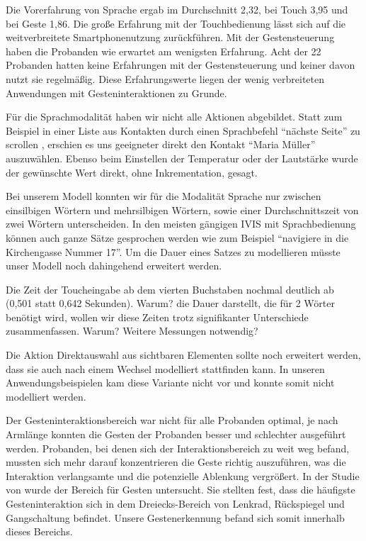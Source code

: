 Die Vorerfahrung von Sprache ergab im Durchschnitt 2,32, bei Touch 3,95 und bei Geste 1,86. Die große Erfahrung mit der Touchbedienung lässt sich auf die weitverbreitete Smartphonenutzung zurückführen. Mit der Gestensteuerung haben die Probanden wie erwartet am wenigsten Erfahrung. Acht der 22 Probanden hatten keine Erfahrungen mit der Gestensteuerung und keiner davon nutzt sie regelmäßig. Diese Erfahrungswerte liegen der wenig verbreiteten Anwendungen mit Gesteninteraktionen zu Grunde.

Für die Sprachmodalität haben wir nicht alle Aktionen abgebildet. 
Statt zum Beispiel in einer Liste aus Kontakten durch einen Sprachbefehl "`nächste Seite"' zu scrollen , erschien es uns geeigneter direkt den Kontakt "`Maria Müller"' auszuwählen. Ebenso beim Einstellen der Temperatur oder der Lautstärke wurde der gewünschte Wert direkt, ohne Inkrementation, gesagt.

Bei unserem Modell konnten wir für die Modalität Sprache nur zwischen einsilbigen Wörtern und mehrsilbigen Wörtern, sowie einer Durchschnittszeit von zwei Wörtern unterscheiden. In den meisten gängigen IVIS mit Sprachbedienung können auch ganze Sätze gesprochen werden wie zum Beispiel "`navigiere in die Kirchengasse Nummer 17"'. Um die Dauer eines Satzes zu modellieren müsste unser Modell noch dahingehend erweitert werden. 

Die Zeit der Toucheingabe ab dem vierten Buchstaben nochmal deutlich ab (0,501 statt 0,642 Sekunden). Warum?
die Dauer darstellt, die für 2 Wörter benötigt wird, wollen wir diese Zeiten trotz signifikanter Unterschiede zusammenfassen. Warum? Weitere Messungen notwendig?

Die Aktion Direktauswahl aus sichtbaren Elementen sollte noch erweitert werden, dass sie auch nach einem Wechsel modelliert stattfinden kann. In unseren Anwendungsbeispielen kam diese Variante nicht vor und konnte somit nicht modelliert werden.

Der Gesteninteraktionsbereich war nicht für alle Probanden optimal, je nach Armlänge konnten die Gesten der Probanden besser und schlechter ausgeführt werden. Probanden, bei denen sich der Interaktionsbereich zu weit weg befand, mussten sich mehr darauf konzentrieren die Geste richtig auszuführen, was die Interaktion verlangsamte und die potenzielle Ablenkung vergrößert. In der Studie von \citet{Riener:2013:SIG} wurde der Bereich für Gesten untersucht. 
Sie stellten fest, dass die häufigste Gesteninteraktion sich in dem Dreiecks-Bereich von Lenkrad, Rückspiegel und Gangschaltung befindet. 
Unsere Gestenerkennung befand sich somit innerhalb dieses Bereichs.

